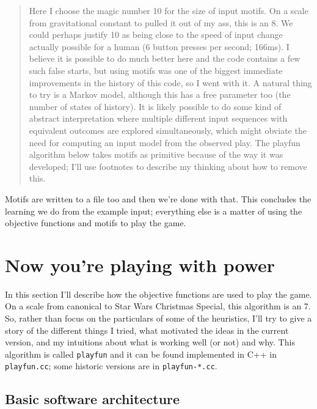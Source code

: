 \documentclass[twocolumn]{article}
\newcommand\parameteralert[1]{
  \begin{quotation}
  \noindent {\bf Parameter Alert!} #1
  \end{quotation}
}
\begin{document}
\parameteralert{Here I choose the magic number 10 for the size of input
  motifs. On a scale from gravitational constant to pulled it out of
  my ass, this is an 8. We could perhaps justify 10 as being close to
  the speed of input change actually possible for a human (6 button
  presses per second; 166ms). I believe it is possible to do much
  better here and the code contains a few such false starts, but using
  motifs was one of the biggest immediate improvements in the history
  of this code, so I went with it. A natural thing to try is a Markov
  model, although this has a free parameter too (the number of states
  of history). It is likely possible to do some kind of abstract
  interpretation where multiple different input sequences with
  equivalent outcomes are explored simultaneously, which might obviate
  the need for computing an input model from the observed play. The
  playfun algorithm below takes motifs as primitive because of the way
  it was developed; I'll use footnotes to describe my thinking about
  how to remove this.}

Motifs are written to a file too and then we're done with that. This
concludes the learning we do from the example input; everything else
is a matter of using the objective functions and motifs to play the
game.

\section{Now you're playing with power} \label{sec:playfun}

In this section I'll describe how the objective functions are used to
play the game. On a scale from canonical to Star Wars Christmas
Special, this algorithm is an 7. So, rather than focus on the
particulars of some of the heuristics, I'll try to give a story of the
different things I tried, what motivated the ideas in the current
version, and my intuitions about what is working well (or not) and
why. This algorithm is called {\tt playfun} and it can be found
implemented in C++ in {\tt playfun.cc}; some historic versions are
in {\tt playfun-*.cc}.

\subsection{Basic software architecture}
\end{document}
